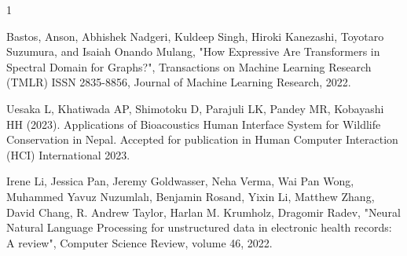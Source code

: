 \begin{雑誌論文}{1}


Bastos, Anson, Abhishek Nadgeri, Kuldeep Singh, Hiroki Kanezashi, Toyotaro Suzumura, and Isaiah Onando Mulang, "How Expressive Are Transformers in Spectral Domain for Graphs?", Transactions on Machine Learning Research (TMLR) ISSN 2835-8856, Journal of Machine Learning Research, 2022.

Uesaka L, Khatiwada AP, Shimotoku D, Parajuli LK, Pandey MR, Kobayashi HH (2023). Applications of Bioacoustics Human Interface System for Wildlife Conservation in Nepal. Accepted for publication in Human Computer Interaction (HCI) International 2023.


Irene Li, Jessica Pan, Jeremy Goldwasser, Neha Verma, Wai Pan Wong, Muhammed Yavuz Nuzumlalı, Benjamin Rosand, Yixin Li, Matthew Zhang, David Chang, R. Andrew Taylor, Harlan M. Krumholz, Dragomir Radev, "Neural Natural Language Processing for unstructured data in electronic health records: A review", Computer Science Review, volume 46, 2022.

\end{雑誌論文}

